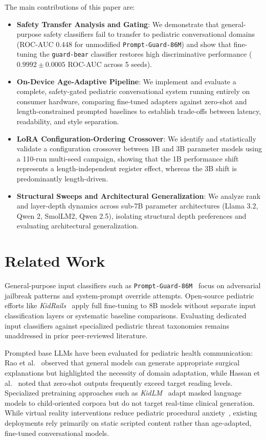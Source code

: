 \documentclass[pdflatex,sn-mathphys-num]{sn-jnl-official}%
\begin{document}
\medskip\noindent The main contributions of this paper are:
\begin{itemize}
    \item \textbf{Safety Transfer Analysis and Gating}: We demonstrate that general-purpose safety classifiers fail to transfer to pediatric conversational domains (ROC-AUC 0.448 for unmodified \texttt{Prompt-Guard-86M}) and show that fine-tuning the \texttt{guard-bear} classifier restores high discriminative performance ($0.9992\pm0.0005$ ROC-AUC across 5 seeds).
    \item \textbf{On-Device Age-Adaptive Pipeline}: We implement and evaluate a complete, safety-gated pediatric conversational system running entirely on consumer hardware, comparing fine-tuned adapters against zero-shot and length-constrained prompted baselines to establish trade-offs between latency, readability, and style separation.
    \item \textbf{LoRA Configuration-Ordering Crossover}: We identify and statistically validate a configuration crossover between 1B and 3B parameter models using a 110-run multi-seed campaign, showing that the 1B performance shift represents a length-independent register effect, whereas the 3B shift is predominantly length-driven.
    \item \textbf{Structural Sweeps and Architectural Generalization}: We analyze rank and layer-depth dynamics across sub-7B parameter architectures (Llama 3.2, Qwen 2, SmolLM2, Qwen 2.5), isolating structural depth preferences and evaluating architectural generalization.
\end{itemize}

\section{Related Work}\label{sec:relatedwork}

General-purpose input classifiers such as \texttt{Prompt-Guard-86M}~\cite{promptguard2024} focus on adversarial jailbreak patterns and system-prompt override attempts. Open-source pediatric efforts like \textit{KidRails}~\cite{kidrails2025} apply full fine-tuning to 8B models without separate input classification layers or systematic baseline comparisons. Evaluating dedicated input classifiers against specialized pediatric threat taxonomies remains unaddressed in prior peer-reviewed literature.

Prompted base LLMs have been evaluated for pediatric health communication: Rao et al.~\cite{rao2025pediatric} observed that general models can generate appropriate surgical explanations but highlighted the necessity of domain adaptation, while Hassan et al.~\cite{hassan2025childconv} noted that zero-shot outputs frequently exceed target reading levels. Specialized pretraining approaches such as \textit{KidLM}~\cite{nayeem2024kidlm} adapt masked language models to child-oriented corpora but do not target real-time clinical generation. While virtual reality interventions reduce pediatric procedural anxiety~\cite{ryu2021vr}, existing deployments rely primarily on static scripted content rather than age-adapted, fine-tuned conversational models.
\end{document}
